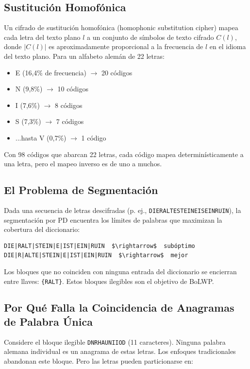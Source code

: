 \documentclass[11pt,a4paper]{article}
\begin{document}
\subsection{Sustitución Homofónica}

Un cifrado de sustitución homofónica (homophonic substitution cipher) mapea cada letra del texto plano $l$ a un conjunto de símbolos de texto cifrado $C(l)$, donde $|C(l)|$ es aproximadamente proporcional a la frecuencia de $l$ en el idioma del texto plano. Para un alfabeto alemán de 22 letras:

\begin{itemize}
\item E (16,4\% de frecuencia) $\rightarrow$ 20 códigos
\item N (9,8\%) $\rightarrow$ 10 códigos
\item I (7,6\%) $\rightarrow$ 8 códigos
\item S (7,3\%) $\rightarrow$ 7 códigos
\item ...hasta V (0,7\%) $\rightarrow$ 1 código
\end{itemize}

Con 98 códigos que abarcan 22 letras, cada código mapea determinísticamente a una letra, pero el mapeo inverso es de uno a muchos.

\subsection{El Problema de Segmentación}

Dada una secuencia de letras descifradas (p. ej., \texttt{DIERALTESTEINEISEINRUIN}), la segmentación por PD encuentra los límites de palabras que maximizan la cobertura del diccionario:

\begin{lstlisting}[style=plain]
DIE|RALT|STEIN|E|IST|EIN|RUIN  $\rightarrow$  subóptimo
DIE|R|ALTE|STEIN|E|IST|EIN|RUIN  $\rightarrow$  mejor
\end{lstlisting}

Los bloques que no coinciden con ninguna entrada del diccionario se encierran entre llaves: \texttt{\{RALT\}}. Estos bloques ilegibles son el objetivo de BoLWP.

\subsection{Por Qué Falla la Coincidencia de Anagramas de Palabra Única}

Considere el bloque ilegible \texttt{DNRHAUNIIOD} (11 caracteres). Ninguna palabra alemana individual es un anagrama de estas letras. Los enfoques tradicionales abandonan este bloque. Pero las letras pueden particionarse en:
\end{document}
